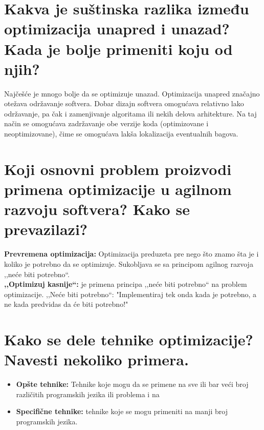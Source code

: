 \documentclass[a4paper]{article}
\begin{document}
\section{Kakva je suštinska razlika između optimizacija unapred i unazad? 
         Kada je bolje primeniti koju od njih?}
  Najčešće je mnogo bolje da se optimizuje unazad.
  Optimizacija unapred značajno otežava održavanje softvera.
  Dobar dizajn softvera omogućava relativno lako održavanje, pa čak i zamenjivanje algoritama ili 
  nekih delova arhitekture. Na taj način se omogućava zadržavanje obe verzije koda (optimizovane i 
  neoptimizovane), čime se omogućava lakša lokalizacija eventualnih bagova.

\section{Koji osnovni problem proizvodi primena optimizacije u agilnom razvoju softvera? 
         Kako se prevazilazi?}
  
  \textbf{Prevremena optimizacija:} Optimizacija preduzeta pre nego što znamo šta je i koliko je
  potrebno da se optimizuje. Sukobljava se sa principom agilnog razvoja ,,neće biti potrebno``.\\
  \indent \textbf{,,Optimizuj kasnije``:} je primena principa ,,neće biti potrebno`` na problem 
  optimizacije. ,,Neće biti potrebno``: "Implementiraj tek onda kada je potrebno, 
  a ne kada predvidas da će biti potrebno!"
   
\section{Kako se dele tehnike optimizacije? Navesti nekoliko primera.}
  \begin{itemize}
    \item \textbf{Opšte tehnike:} Tehnike koje mogu da se primene na sve ili bar veći broj 
          različitih programskih jezika ili problema i na 
    \item \textbf{Specifične tehnike:} tehnike koje se mogu primeniti na manji broj programskih jezika.
  \end{itemize}
\end{document}
